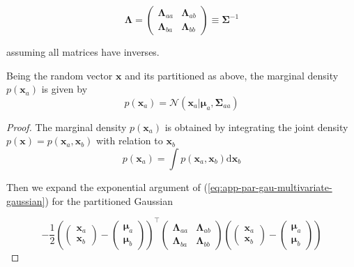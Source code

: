 \begin{appendices}
  \begin{equation}
    \boldsymbol{\Lambda} = 
    \begin{pmatrix}
      \boldsymbol{\Lambda}_{aa} & \boldsymbol{\Lambda}_{ab}  \\
      \boldsymbol{\Lambda}_{ba} & \boldsymbol{\Lambda}_{bb}
    \end{pmatrix} 
    \equiv \boldsymbol{\Sigma}^{-1}
  \end{equation}

  assuming all matrices have inverses.

  \begin{theorem}[Marginalization]
    \label{theorem:app-gau-margin}
    Being the random vector $\mathbf{x}$ and its partitioned as above, the marginal density $p(\mathbf{x}_a)$ is given by
    \begin{displaymath}
      p(\mathbf{x}_a) = \mathcal{N}\left( \mathbf{x}_a | \boldsymbol{\mu}_a, \boldsymbol{\Sigma}_{aa} \right)
    \end{displaymath}
  \end{theorem}

  \begin{proof}
    The marginal density $p(\mathbf{x}_a)$ is obtained by integrating the joint density $p(\mathbf{x})=p\left(\mathbf{x}_{a}, \mathbf{x}_{b}\right)$ with relation to $\mathbf{x}_b$
    \begin{equation}
      p\left(\mathbf{x}_{a}\right)=\int p\left(\mathbf{x}_{a}, \mathbf{x}_{b}\right) \mathrm{d} \mathbf{x}_{b}
    \end{equation}

    Then we expand the exponential argument of (\ref{eq:app-par-gau-multivariate-gaussian}) for the partitioned Gaussian

    \begin{equation}
      -\frac{1}{2}
      \left( \begin{pmatrix}
        \mathbf{x}_a \\  
        \mathbf{x}_b 
        \end{pmatrix}
        -\begin{pmatrix}
          \boldsymbol{\mu}_a \\
          \boldsymbol{\mu}_b
        \end{pmatrix}
        \right)^\top
        \begin{pmatrix}
          \boldsymbol{\Lambda}_{aa} & \boldsymbol{\Lambda}_{ab}  \\
          \boldsymbol{\Lambda}_{ba} & \boldsymbol{\Lambda}_{bb}
        \end{pmatrix} 
        \left( \begin{pmatrix}
          \mathbf{x}_a \\  
          \mathbf{x}_b 
          \end{pmatrix}
          -\begin{pmatrix}
            \boldsymbol{\mu}_a \\
            \boldsymbol{\mu}_b
          \end{pmatrix}
          \right)
    \end{equation}
    

\end{proof}
\end{appendices}
